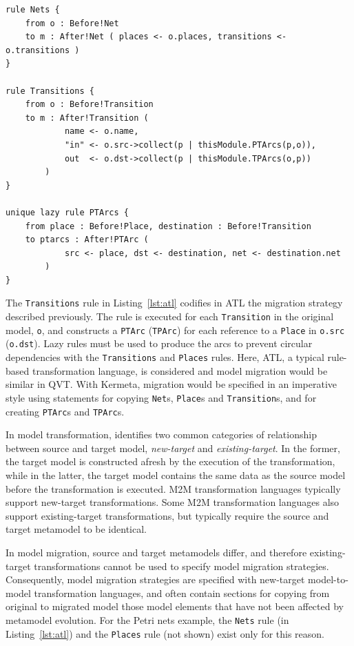 \begin{lstlisting}[float=tbp, caption={[Fragment of the Petri nets model migration in ATL]Fragment of the Petri nets model migration in ATL, taken from \cite{rose10flock}}, label=lst:atl, language=ATL]
rule Nets {
	from o : Before!Net
	to m : After!Net ( places <- o.places, transitions <- o.transitions )
}

rule Transitions {
	from o : Before!Transition
	to m : After!Transition (
			name <- o.name,
			"in" <- o.src->collect(p | thisModule.PTArcs(p,o)),
			out  <- o.dst->collect(p | thisModule.TPArcs(o,p))
		)
}

unique lazy rule PTArcs {
	from place : Before!Place, destination : Before!Transition
	to ptarcs : After!PTArc (
			src <- place, dst <- destination, net <- destination.net
		)
}
\end{lstlisting}

The \texttt{Transitions} rule in Listing~\ref{lst:atl} codifies in ATL the migration strategy described previously. The rule is executed for each \texttt{Transition} in the original model, \texttt{o}, and constructs a \texttt{PTArc} (\texttt{TPArc}) for each reference to a \texttt{Place} in \texttt{o.src} (\texttt{o.dst}). Lazy rules must be used to produce the arcs to prevent circular dependencies with the \texttt{Transitions} and \texttt{Places} rules. Here, ATL, a typical rule-based transformation language, is considered and model migration would be similar in QVT. With Kermeta, migration would be specified in an imperative style using statements for copying \texttt{Net}s, \texttt{Place}s and \texttt{Transition}s, and for creating \texttt{PTArc}s and \texttt{TPArc}s.

In model transformation, \cite{czarnecki06survey} identifies two common categories of relationship between source and target model, \emph{new-target} and \emph{existing-target}. In the former, the target model is constructed afresh by the execution of the transformation, while in the latter, the target model contains the same data as the source model before the transformation is executed. M2M transformation languages typically support new-target transformations. Some M2M transformation languages also support existing-target transformations, but typically require the source and target metamodel to be identical.

In model migration, source and target metamodels differ, and therefore existing-target transformations cannot be used to specify model migration strategies. Consequently, model migration strategies are specified with new-target model-to-model transformation languages, and often contain sections for copying from original to migrated model those model elements that have not been affected by metamodel evolution. For the Petri nets example, the \texttt{Nets} rule (in Listing~\ref{lst:atl}) and the \texttt{Places} rule (not shown) exist only for this reason.


